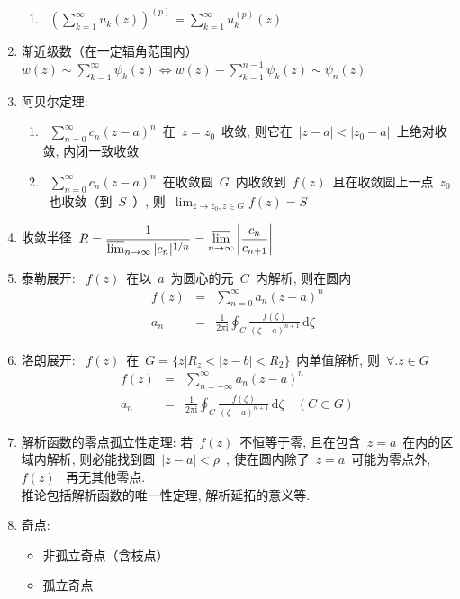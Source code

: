 \documentclass[11pt,a4paper]{article}
\newcommand\diff{\,\mathrm{d}}
\renewcommand{\m}[1]{~$\displaystyle#1$~}
\newcommand\mi{\mathrm{i}}
\begin{document}
\begin{enumerate}
\begin{enumerate}
          \item \m{\left(\sum_{k=1}^{\infty} u_k(z)\right)^{(p)} = \sum_{k=1}^{\infty} u_k^{(p)}(z)}
        \end{enumerate}
      \item 渐近级数（在一定辐角范围内）\m{w(z)\sim\sum_{k=1}^{\infty} \psi_k(z)\Leftrightarrow w(z)- \sum_{k=1}^{n-1} \psi_k(z)\sim \psi_n(z)}
      \item 阿贝尔定理:
        \begin{enumerate}
          \item \m{\sum_{n=0}^{\infty} c_n(z-a)^n}在\m{z = z_0}收敛, 则它在\m{|z-a|<|z_0 - a|}上绝对收敛, 内闭一致收敛\\
          \item \m{\sum_{n=0}^{\infty} c_n(z-a)^n}在收敛圆\m{G}内收敛到\m{f(z)}且在收敛圆上一点\m{z_0}也收敛（到\m{S}）, 则\m{\lim_{z\to z_0,z\in G}f(z) = S}
        \end{enumerate}
      \item 收敛半径\m{R = \frac 1{\varlimsup_{n\to\infty}|c_n|^{1/n}} = \varlimsup_{n\to\infty}\left|\frac {c_n}{c_{n+1}}\right|}
      \item 泰勒展开: \m{f(z)}在以\m{a}为圆心的元\m{C}内解析, 则在圆内
        \begin{eqnarray*}
            f(z) &=& \sum_{n=0}^{\infty} a_n(z-a)^n \\
            a_n &=& \frac 1{2\pi\mi}\oint_C\frac{f(\zeta)}{(\zeta-a)^{n+1}}\diff \zeta
        \end{eqnarray*}
      \item 洛朗展开: \m{f(z)}在\m{G = \{z|R_z < |z-b| < R_2\}}内单值解析, 则\m{\forall.z\in G}
        \begin{eqnarray*}
            f(z) &=& \sum_{n=-\infty}^{\infty} a_n(z-a)^n \\
            a_n &=& \frac 1{2\pi\mi}\oint_C\frac{f(\zeta)}{(\zeta-a)^{n+1}}\diff \zeta\quad(C\subset G)
        \end{eqnarray*}
      \item 解析函数的零点孤立性定理: 若\m{f(z)}不恒等于零, 且在包含\m{z = a}在内的区域内解析, 则必能找到圆\m{|z-a| < \rho}, 使在圆内除了\m{z = a}可能为零点外, \m{f(z)} 再无其他零点.\\
          推论包括解析函数的唯一性定理, 解析延拓的意义等.
      \item 奇点:
        \begin{itemize}
          \item 非孤立奇点（含枝点）
          \item 孤立奇点

\end{itemize}
\end{enumerate}
\end{document}
